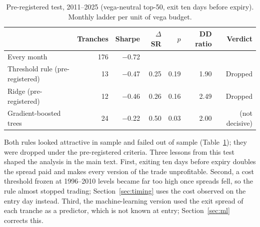 \begin{table}[h]
  \centering
  \small
  \caption{Pre-registered test, 2011--2025 (vega-neutral top-50, exit ten days before expiry). Monthly ladder per unit of vega budget.}
  \label{tab:prereg}
  \begin{tabular}{lrrrrrr}
    \toprule
    & Tranches & Sharpe & $\Delta$SR & $p$ & DD ratio & Verdict \\
    \midrule
    Every month                    & 176 & $-$0.72 & & & & \\
    Threshold rule (pre-registered) &  13 & $-$0.47 & 0.25 & 0.19 & 1.90 & Dropped \\
    Ridge (pre-registered)         &  12 & $-$0.46 & 0.26 & 0.16 & 2.49 & Dropped \\
    Gradient-boosted trees         &  24 & $-$0.22 & 0.50 & 0.03 & 2.00 & (not decisive) \\
    \bottomrule
  \end{tabular}
\end{table}

Both rules looked attractive in sample and failed out of sample (Table~\ref{tab:prereg}); they were dropped under the pre-registered criteria. Three lessons from this test shaped the analysis in the main text. First, exiting ten days before expiry doubles the spread paid and makes every version of the trade unprofitable. Second, a cost threshold frozen at 1996--2010 levels became far too high once spreads fell, so the rule almost stopped trading; Section~\ref{sec:timing} uses the cost observed on the entry day instead. Third, the machine-learning version used the exit spread of each tranche as a predictor, which is not known at entry; Section~\ref{sec:ml} corrects this.
